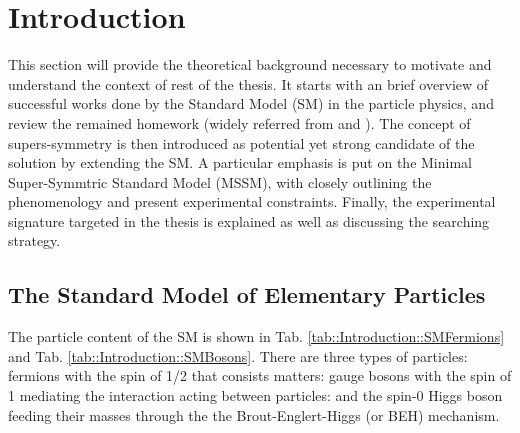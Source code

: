 \section{Introduction}
This section will provide the theoretical background necessary to motivate and understand the context of rest of the thesis.
It starts with an brief overview of successful works done by the Standard Model (SM) in the particle physics, and review the remained homework (widely referred from \cite{Peskin} and \cite{QandL}).
The concept of supers-symmetry is then introduced as potential yet strong candidate of the solution by extending the SM.
A particular emphasis is put on the Minimal Super-Symmtric Standard Model (MSSM), with closely outlining the phenomenology and present experimental constraints.
Finally, the experimental signature targeted in the thesis is explained as well as discussing the searching strategy. \\


\subsection{The Standard Model of Elementary Particles}
The particle content of the SM is shown in Tab. \ref{tab::Introduction::SMFermions} and Tab. \ref{tab::Introduction::SMBosons}. There are three types of particles: fermions with the spin of 1/2 that consists matters: gauge bosons with the spin of 1 mediating the interaction acting between particles: and the spin-0 Higgs boson feeding their masses through the the Brout-Englert-Higgs (or BEH) mechanism. \\

